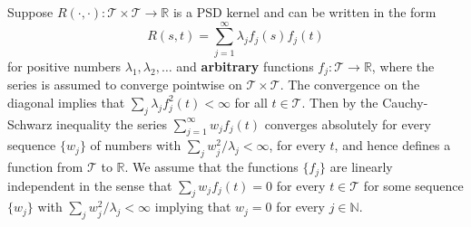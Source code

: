 \documentclass[11pt]{article}
\theoremstyle{plain}
\theoremstyle{definition}
\theoremstyle{remark}
\begin{document}
Suppose $R(\cdot,\cdot):\mathcal T \times \mathcal T \to \mathbb R$ is a PSD kernel and can be written in the form
\begin{equation}\label{eq:Mex}
    R(s, t)=\sum_{j=1}^\infty \lambda_j f_j(s) f_j (t) 
\end{equation}
for positive numbers $\lambda_1,\lambda_2,\ldots$ and \textbf{arbitrary} functions $f_j: \mathcal T \to \mathbb R$, where the series is assumed to converge pointwise on $\mathcal T \times \mathcal T$.
The convergence on the diagonal implies that $\sum_{j}\lambda_j f_j^2 (t) <\infty$ for all $t\in \mathcal T$.
Then by the Cauchy-Schwarz inequality the series $\sum_{j=1}^\infty w_j f_j(t)$
converges absolutely for every sequence $\{w_j\}$ of numbers with $\sum_{j} w_j^2/\lambda_j <\infty$, for every $t$, and hence defines a function from $\mathcal T$ to $\mathbb R$.
We assume that the functions $\{f_j\}$ are linearly independent in the sense that $\sum_{j}w_j f_j(t)=0$ for every $t\in \mathcal T$ for some sequence $\{w_j\}$ with $\sum_{j}w_j^2/\lambda_j <\infty$ implying that $w_j =0$ for every $j\in \mathbb N$.
\end{document}
